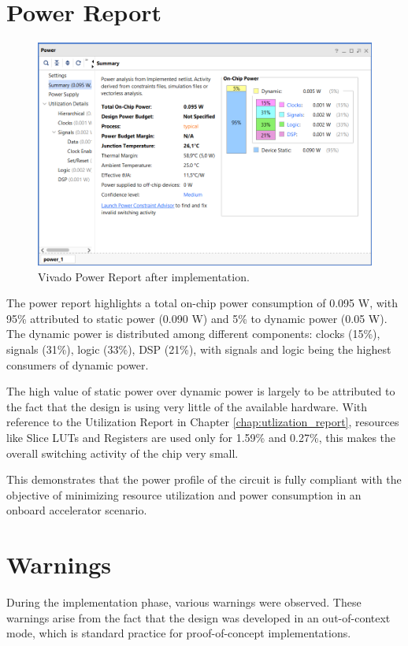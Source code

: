 \section{Power Report}
\begin{figure}[H]
    \centering
    \captionsetup{skip=10pt} 
    \includegraphics[width=\textwidth]{./images/Vivado/power_report.png}
    \caption{Vivado Power Report after implementation.}
    \label{fig:power_report}
\end{figure}
The power report highlights a total on-chip power consumption of 0.095 W, with 95\% attributed to static power (0.090 W) and 5\% to dynamic power (0.05 W). The dynamic power is distributed among different components: clocks (15\%), signals (31\%), logic (33\%), DSP (21\%), with signals and logic being the highest consumers of dynamic power.

The high value of static power over dynamic power is largely to be attributed to the fact that the design is using very little of the available hardware. With reference to the Utilization Report in Chapter \ref{chap:utlization_report}, resources like Slice LUTs and Registers are used only for 1.59\% and 0.27\%, this makes the overall switching activity of the chip very small.

This demonstrates that the power profile of the circuit is fully compliant with the objective of minimizing resource utilization and power consumption in an onboard accelerator scenario.

\section{Warnings}
During the implementation phase, various warnings were observed. These warnings arise from the fact that the design was developed in an out-of-context mode, which is standard practice for proof-of-concept implementations.

